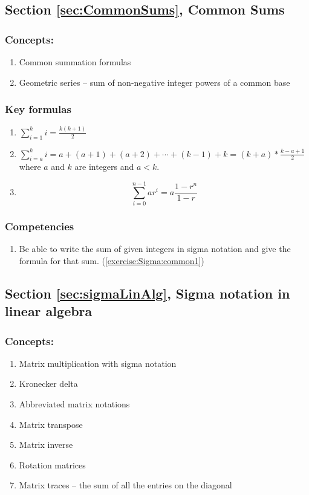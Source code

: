 \subsection*{Section \ref{sec:CommonSums}, Common Sums}
\subsubsection*{Concepts:}
\begin{enumerate}
\item 
Common summation formulas
\item
Geometric series -- sum of non-negative integer powers of a common base
\end{enumerate}

\subsubsection*{Key formulas}
\begin{enumerate}
\item
$\displaystyle{\sum_{i = 1}^{k}i= \frac{k(k + 1)}{2}}$
\item
$\displaystyle{\sum_{i = a}^{k}i} = a + (a + 1) + (a + 2) + \cdots + (k - 1) + k = (k + a) * \frac{k - a + 1}{2}$ where $a$ and $k$ are integers and $a<k$.
\item
\[ \sum_{i=0}^{n-1} ar^i = a \dfrac{1-r^n}{1-r} \]

\end{enumerate}

\subsubsection*{Competencies}
\begin{enumerate}
\item
Be able to write the sum of given integers in sigma notation and give the formula for that sum. (\ref{exercise:Sigma:common1})
\end{enumerate}


\subsection*{Section \ref{sec:sigmaLinAlg}, Sigma notation in linear algebra}
\subsubsection*{Concepts:}
\begin{enumerate}
\item 
Matrix multiplication with sigma notation
\item
Kronecker delta
\item
Abbreviated matrix notations
\item
Matrix transpose
\item
Matrix inverse
\item
Rotation matrices
\item
Matrix traces -- the sum of all the entries on the diagonal
\end{enumerate}


